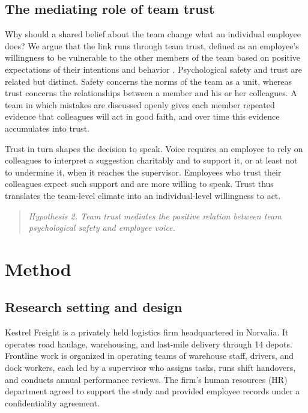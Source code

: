 \documentclass[11pt]{article}
\begin{document}
\subsection{The mediating role of team trust}

Why should a shared belief about the team change what an individual employee does? We argue that the link runs through team trust, defined as an employee's willingness to be vulnerable to the other members of the team based on positive expectations of their intentions and behavior \citep{marisco2012}. Psychological safety and trust are related but distinct. Safety concerns the norms of the team as a unit, whereas trust concerns the relationships between a member and his or her colleagues. A team in which mistakes are discussed openly gives each member repeated evidence that colleagues will act in good faith, and over time this evidence accumulates into trust.

Trust in turn shapes the decision to speak. Voice requires an employee to rely on colleagues to interpret a suggestion charitably and to support it, or at least not to undermine it, when it reaches the supervisor. Employees who trust their colleagues expect such support and are more willing to speak. Trust thus translates the team-level climate into an individual-level willingness to act.

\begin{quote}
\textit{Hypothesis 2. Team trust mediates the positive relation between team psychological safety and employee voice.}
\end{quote}

\section{Method}

\subsection{Research setting and design}

Kestrel Freight is a privately held logistics firm headquartered in Norvalia. It operates road haulage, warehousing, and last-mile delivery through 14 depots. Frontline work is organized in operating teams of warehouse staff, drivers, and dock workers, each led by a supervisor who assigns tasks, runs shift handovers, and conducts annual performance reviews. The firm's human resources (HR) department agreed to support the study and provided employee records under a confidentiality agreement.
\end{document}
